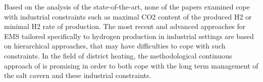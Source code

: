 Based on the analysis of the state-of-the-art, none of the papers examined cope with industrial constraints such as maximal CO2 content of the produced H2 or minimal H2 rate of production. The most recent and advanced approaches for EMS tailored specifically to hydrogen production in industrial settings are based on hierarchical approaches, that may have difficulties to cope with such constraints. In the field of district heating, the methodological continuous approach of \cite{cuisinier_new_2022} is promising in order to both cope with the long term management of the salt cavern and these industrial constraints.
